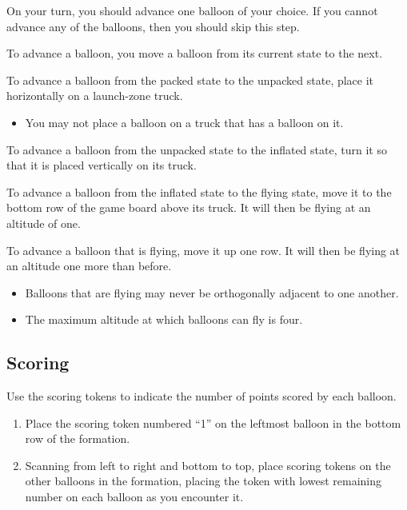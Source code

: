 \documentclass[a6paper, 11pt, parskip=half, DIV=15]{scrartcl}
\begin{document}
On your turn, you should advance one balloon of your choice. If you cannot advance any of the balloons, then you should skip this step.

\newpage
To advance a balloon, you move a balloon from its current state to the next.
\begin{description}[leftmargin=0pt]
  \item[Unpack:] To advance a balloon from the packed state to the unpacked state, place it horizontally on a launch-zone truck.
  \begin{itemize}
    \item You may not place a balloon on a truck that has a balloon on it.
  \end{itemize}
  \item[Inflate:] To advance a balloon from the unpacked state to the inflated state, turn it so that it is placed vertically on its truck.
  \item[Launch:] To advance a balloon from the inflated state to the flying state, move it to the bottom row of the game board above its truck. It will then be flying at an altitude of one.
  \item[Ascend:] To advance a balloon that is flying, move it up one row. It will then be flying at an altitude one more than before.
  \begin{itemize}
    \item Balloons that are flying may never be orthogonally adjacent to one another.%
    \item The maximum altitude at which balloons can fly is four.
  \end{itemize}
\end{description}

\newpage
\enlargethispage{1.75\baselineskip}
\subsection*{Scoring}

Use the scoring tokens to indicate the number of points scored by each balloon.
\begin{enumerate}
  \item Place the scoring token numbered ``1'' on the leftmost balloon in the bottom row of the formation.
  \item Scanning from left to right and bottom to top, place scoring tokens on the other balloons in the formation, placing the token with lowest remaining number on each balloon as you encounter it.
\end{enumerate}
\end{document}
